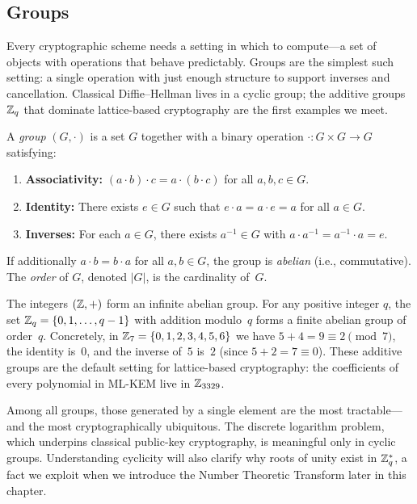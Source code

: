 \subsection{Groups}
\label{subsec:groups}

Every cryptographic scheme needs a setting in which to compute---a set of objects with operations that behave predictably.  Groups are the simplest such setting: a single operation with just enough structure to support inverses and cancellation.  Classical Diffie--Hellman lives in a cyclic group; the additive groups $\mathbb{Z}_q$ that dominate lattice-based cryptography are the first examples we meet.

\begin{definition}[Group]
\label{def:group}
A \emph{group} $(G, \cdot)$ is a set $G$ together with a binary operation $\cdot : G \times G \to G$ satisfying:
\begin{enumerate}
\item \textbf{Associativity:} $(a \cdot b) \cdot c = a \cdot (b \cdot c)$ for all $a,b,c \in G$.
\item \textbf{Identity:} There exists $e \in G$ such that $e \cdot a = a \cdot e = a$ for all $a \in G$.
\item \textbf{Inverses:} For each $a \in G$, there exists $a^{-1} \in G$ with $a \cdot a^{-1} = a^{-1} \cdot a = e$.
\end{enumerate}
If additionally $a \cdot b = b \cdot a$ for all $a,b \in G$, the group is \emph{abelian} (i.e., commutative).  The \emph{order} of $G$, denoted $|G|$, is the cardinality of~$G$.
\end{definition}

\begin{example}
\label{ex:additive-groups}
The integers $(\mathbb{Z}, +)$ form an infinite abelian group.  For any positive integer $q$, the set $\mathbb{Z}_q = \{0, 1, \ldots, q-1\}$ with addition modulo~$q$ forms a finite abelian group of order~$q$.  Concretely, in $\mathbb{Z}_7 = \{0,1,2,3,4,5,6\}$ we have $5 + 4 = 9 \equiv 2 \pmod{7}$, the identity is~$0$, and the inverse of~$5$ is~$2$ (since $5 + 2 = 7 \equiv 0$).  These additive groups are the default setting for lattice-based cryptography: the coefficients of every polynomial in ML-KEM live in $\mathbb{Z}_{3329}$.
\end{example}

Among all groups, those generated by a single element are the most tractable---and the most cryptographically ubiquitous.  The discrete logarithm problem, which underpins classical public-key cryptography, is meaningful only in cyclic groups.  Understanding cyclicity will also clarify why roots of unity exist in $\mathbb{Z}_q^*$, a fact we exploit when we introduce the Number Theoretic Transform later in this chapter.

